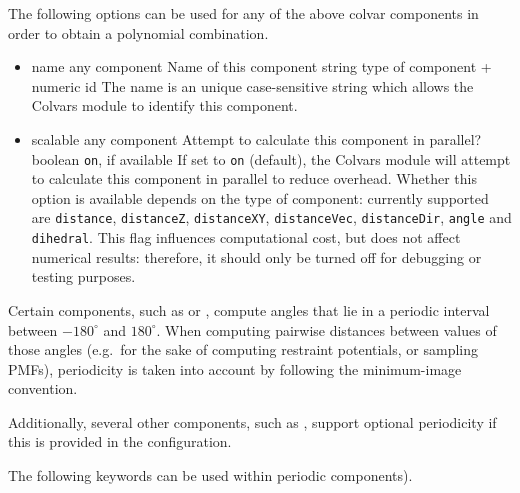 The following options can be used for any of the above colvar components in order to obtain a polynomial combination\ifdefined{}\fi.
\begin{itemize}
\item %
  \keydef
    {name}{%
    any component}{%
    Name of this component}{%
    string}{%
    type of component + numeric id}{%
    The name is an unique case-sensitive string which allows the
    Colvars module to identify this component. 
    \ifdefined{}\fi
    }

\item %
  \keydef
    {scalable}{%
    any component}{%
    Attempt to calculate this component in parallel?}{%
    boolean}{%
    \texttt{on}, if available}{%
    If set to \texttt{on} (default), the Colvars module will attempt to calculate this component in parallel to reduce overhead.
    Whether this option is available depends on the type of component: currently supported are \texttt{distance}, \texttt{distanceZ}, \texttt{distanceXY}, \texttt{distanceVec}, \texttt{distanceDir}, \texttt{angle} and \texttt{dihedral}.
    This flag influences computational cost, but does not affect numerical results: therefore, it should only be turned off for debugging or testing purposes.
  }
\end{itemize}



Certain components, such as  or
, compute angles that lie in a periodic interval between
$-180^\circ$ and $180^\circ$.  When computing pairwise distances between values of those angles
(e.g.\ for the sake of computing restraint potentials, or sampling PMFs), periodicity is taken into
account by following the minimum-image convention.

Additionally, several other components, such as , support
optional periodicity if this is provided in the configuration.

The following keywords can be used within periodic components).

